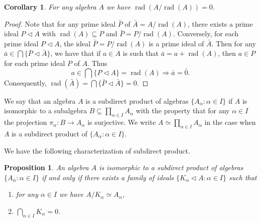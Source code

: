 \documentclass{article}
\newtheorem{proposition}[theorem]{Proposition}
\newtheorem{corollary}[theorem]{Corollary}
\begin{document}
\begin{corollary}
For any algebra $A$ we have $\operatorname{rad}(A/\operatorname{rad}(A)) = 0$.
\end{corollary}

\begin{proof}
Note that for any prime ideal $\bar{P}$ of $\bar{A} = A/\operatorname{rad}(A)$, there exists a prime ideal $P \triangleleft A$ with $\operatorname{rad}(A) \subseteq P$ and $\bar{P} = P/\operatorname{rad}(A)$. Conversely, for each prime ideal $P \triangleleft A$, the ideal $\bar{P} = P/\operatorname{rad}(A)$ is a prime ideal of $\bar{A}$. Then for any $\bar{a} \in \bigcap \{\bar{P} \triangleleft \bar{A}\}$, we have that if $a \in A$ is such that $\bar{a} = a + \operatorname{rad}(A)$, then $a \in P$ for each prime ideal $P$ of $A$. Thus
\[
a \in \bigcap\{P \triangleleft A\} = \operatorname{rad}(A) \Rightarrow \bar{a} = \bar{0}.
\]
Consequently, $\operatorname{rad}(\bar{A}) = \bigcap \{\bar{P} \triangleleft \bar{A}\} = 0$.
\end{proof}

\begin{definition}
We say that an algebra $A$ is a subdirect product of algebras $\{A_\alpha : \alpha \in I\}$ if $A$ is isomorphic to a subalgebra $B \subseteq \prod_{\alpha \in I} A_\alpha$ with the property that for any $\alpha \in I$ the projection $\pi_\alpha : B \to A_\alpha$ is surjective.
We write $A \simeq \prod_{\alpha \in I} A_\alpha$ in the case when $A$ is a subdirect product of $\{A_\alpha : \alpha \in I\}$.
\end{definition}

We have the following characterization of subdirect product.

\begin{proposition}
An algebra $A$ is isomorphic to a subdirect product of algebras $\{A_\alpha : \alpha \in I\}$ if and only if there exists a family of ideals $\{K_\alpha \triangleleft A : \alpha \in I\}$ such that
\begin{enumerate}
\item[(i)] for any $\alpha \in I$ we have $A / K_\alpha \simeq A_\alpha$,
\item[(ii)] $\bigcap_{\alpha \in I} K_\alpha = 0$.
\end{enumerate}
\end{proposition}
\end{document}

